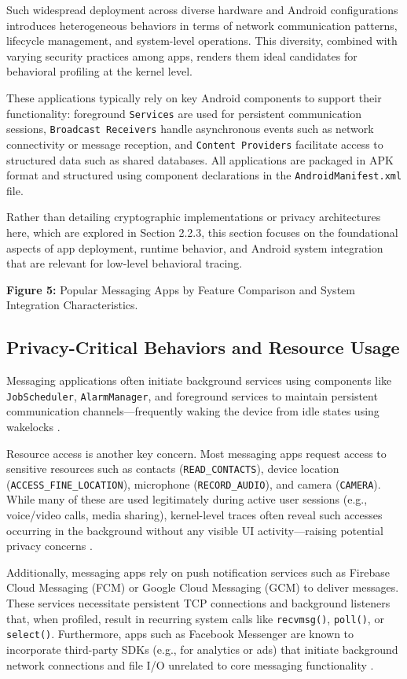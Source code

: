 \documentclass[a4paper,12pt]{report}
\begin{document}
Such widespread deployment across diverse hardware and Android configurations introduces heterogeneous behaviors in terms of network communication patterns, lifecycle management, and system-level operations. This diversity, combined with varying security practices among apps, renders them ideal candidates for behavioral profiling at the kernel level.

These applications typically rely on key Android components to support their functionality: foreground \texttt{Services} are used for persistent communication sessions, \texttt{Broadcast Receivers} handle asynchronous events such as network connectivity or message reception, and \texttt{Content Providers} facilitate access to structured data such as shared databases. All applications are packaged in APK format and structured using component declarations in the \texttt{AndroidManifest.xml} file.

Rather than detailing cryptographic implementations or privacy architectures here, which are explored in Section 2.2.3, this section focuses on the foundational aspects of app deployment, runtime behavior, and Android system integration that are relevant for low-level behavioral tracing.

\textbf{Figure 5:} Popular Messaging Apps by Feature Comparison and System Integration Characteristics.

\subsection{Privacy-Critical Behaviors and Resource Usage}
Messaging applications often initiate background services using components like \texttt{JobScheduler}, \texttt{AlarmManager}, and foreground services to maintain persistent communication channels—frequently waking the device from idle states using wakelocks \cite{androidwakelocks}.

Resource access is another key concern. Most messaging apps request access to sensitive resources such as contacts (\texttt{READ\_CONTACTS}), device location (\texttt{ACCESS\_FINE\_LOCATION}), microphone (\texttt{RECORD\_AUDIO}), and camera (\texttt{CAMERA}). While many of these are used legitimately during active user sessions (e.g., voice/video calls, media sharing), kernel-level traces often reveal such accesses occurring in the background without any visible UI activity—raising potential privacy concerns \cite{reardon2019leakage}.

Additionally, messaging apps rely on push notification services such as Firebase Cloud Messaging (FCM) or Google Cloud Messaging (GCM) to deliver messages. These services necessitate persistent TCP connections and background listeners that, when profiled, result in recurring system calls like \texttt{recvmsg()}, \texttt{poll()}, or \texttt{select()}. Furthermore, apps such as Facebook Messenger are known to incorporate third-party SDKs (e.g., for analytics or ads) that initiate background network connections and file I/O unrelated to core messaging functionality \cite{pi2018metadata}.
\end{document}
